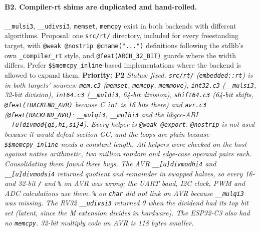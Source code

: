 \documentclass[11pt,a4paper]{article}
\newcommand{\pkg}[1]{\texttt{#1}}
\newcommand{\prio}[1]{\textbf{Priority: #1}}
\begin{document}
\paragraph{B2. Compiler-rt shims are duplicated and hand-rolled.}
\pkg{\_\_mulsi3}, \pkg{\_\_udivsi3}, \pkg{memset}, \pkg{memcpy} exist in both backends with different
algorithms. Proposal: one \pkg{src/rt/} directory, included for every freestanding target,
with \pkg{@weak @nostrip @cname("...")} definitions following the stdlib's own
\pkg{\_compiler\_rt} style, and \pkg{@feat(ARCH\_32\_BIT)} guards where the width differs.
Prefer \pkg{\$\$memcpy\_inline}-based implementations where the backend is allowed to expand them.
\prio{P2}
\textit{Status: fixed. \pkg{src/rt/} (\pkg{embedded::rt}) is in both targets' sources: \pkg{mem.c3} (\pkg{memset}, \pkg{memcpy}, \pkg{memmove}), \pkg{int32.c3} (\pkg{\_\_mulsi3}, 32-bit division), \pkg{int64.c3} (\pkg{\_\_muldi3}, 64-bit division), \pkg{shift64.c3} (64-bit shifts, \pkg{@feat(!BACKEND\_AVR)} because C \pkg{int} is 16 bits there) and \pkg{avr.c3} (\pkg{@feat(BACKEND\_AVR)}: \pkg{\_\_mulqi3}, \pkg{\_\_mulhi3} and the libgcc-ABI \pkg{\_\_[u]divmod\{qi,hi,si\}4}). Every helper is \pkg{@weak @export}. \pkg{@nostrip} is not used because it would defeat section GC, and the loops are plain because \pkg{\$\$memcpy\_inline} needs a constant length. All helpers were checked on the host against native arithmetic, two million random and edge-case operand pairs each. Consolidating them found three bugs. The AVR \pkg{\_\_[u]divmodhi4} and \pkg{\_\_[u]divmodsi4} returned quotient and remainder in swapped halves, so every 16- and 32-bit \pkg{/} and \pkg{\%} on AVR was wrong; the UART baud, I2C clock, PWM and ADC calculations use them. \pkg{\%} on \pkg{char} did not link on AVR because \pkg{\_\_mulqi3} was missing. The RV32 \pkg{\_\_udivsi3} returned 0 when the dividend had its top bit set (latent, since the M extension divides in hardware). The ESP32-C3 also had no \pkg{memcpy}. 32-bit multiply code on AVR is 118 bytes smaller.}
\end{document}
